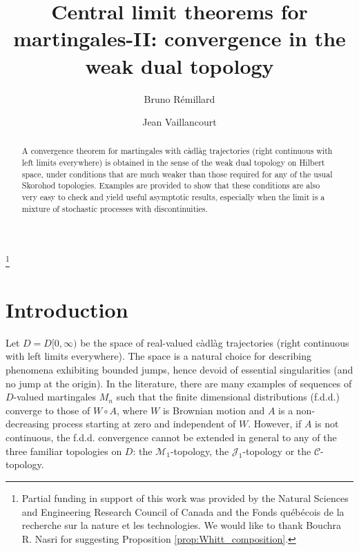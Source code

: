 \documentclass[final]{amsart}
\theoremstyle{definition}
\numberwithin{equation}{section}
\begin{document}
\title[CLT for martingales-II: convergence in weak dual topology]{Central limit theorems for martingales-II: convergence in the weak dual topology}

\author{Bruno R\'{e}millard}
\address{GERAD and Department of Decision Sciences, HEC Montr\'{e}al\\
3000, che\-min de la C\^{o}\-te-Sain\-te-Ca\-the\-ri\-ne,
Montr\'{e}al (Qu\'{e}\-bec), Canada H3T 2A7}

\author{Jean Vaillancourt}
\address{Department of Decision Sciences, HEC Montr\'{e}al\\
3000, che\-min de la C\^{o}\-te-Sain\-te-Ca\-the\-ri\-ne,
Montr\'{e}al (Qu\'{e}\-bec), Canada H3T 2A7} 

\thanks{Partial funding in support of this work was provided by the Natural
Sciences and Engineering Research Council of Canada and  the Fonds
qu\'e\-b\'e\-cois de la re\-cher\-che sur la na\-tu\-re et les
tech\-no\-lo\-gies.
We would like to thank Bouchra R. Nasri for suggesting Proposition \ref{prop:Whitt_composition}.}


\begin{abstract}
A convergence theorem for martingales with c\`adl\`ag trajectories (right continuous with left limits everywhere) is obtained in the sense of the weak dual topology on Hilbert space, under conditions that are much weaker than those required for any of the usual Skorohod topologies.
Examples are provided to show that these conditions are also very easy to check and yield
useful asymptotic results, especially when the limit is a mixture of stochastic processes with discontinuities.
\end{abstract}



\maketitle

\section{Introduction}
Let $D= D[0,\infty)$ be the space of real-valued c\`adl\`ag trajectories (right continuous with left limits everywhere).
The space is a natural choice for describing phenomena exhibiting bounded jumps, hence devoid
of essential singularities (and no jump at the origin).  In the literature, there are many examples of sequences of
$D$-valued martingales $M_n$ such that the finite dimensional distributions (f.d.d.) converge to those of $W\circ A$,
where $W$ is Brownian motion and $A$ is a non-decreasing process starting at zero and independent of $W$.
However, if $A$ is not continuous, the f.d.d. convergence cannot be extended in general to any of the three familiar topologies on $D$:
the $\mathcal{M}_1$-topology, the $\mathcal{J}_1$-topology or the $\mathcal{C}$-topology.
\end{document}
